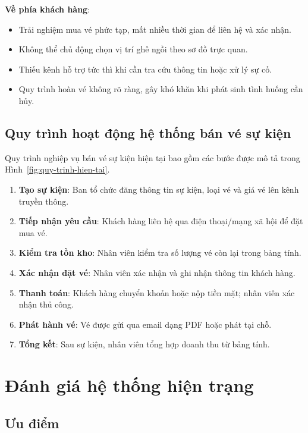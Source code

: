 \documentclass[../main.tex]{subfiles}
\begin{document}
\textbf{Về phía khách hàng}:
\begin{itemize}
    \item Trải nghiệm mua vé phức tạp, mất nhiều thời gian để liên hệ và xác nhận.
    \item Không thể chủ động chọn vị trí ghế ngồi theo sơ đồ trực quan.
    \item Thiếu kênh hỗ trợ tức thì khi cần tra cứu thông tin hoặc xử lý sự cố.
    \item Quy trình hoàn vé không rõ ràng, gây khó khăn khi phát sinh tình huống cần hủy.
\end{itemize}

\subsection{Quy trình hoạt động hệ thống bán vé sự kiện}

Quy trình nghiệp vụ bán vé sự kiện hiện tại bao gồm các bước được mô tả trong Hình~\ref{fig:quy-trinh-hien-tai}.

\begin{enumerate}
    \item \textbf{Tạo sự kiện}: Ban tổ chức đăng thông tin sự kiện, loại vé và giá vé lên kênh truyền thông.
    \item \textbf{Tiếp nhận yêu cầu}: Khách hàng liên hệ qua điện thoại/mạng xã hội để đặt mua vé.
    \item \textbf{Kiểm tra tồn kho}: Nhân viên kiểm tra số lượng vé còn lại trong bảng tính.
    \item \textbf{Xác nhận đặt vé}: Nhân viên xác nhận và ghi nhận thông tin khách hàng.
    \item \textbf{Thanh toán}: Khách hàng chuyển khoản hoặc nộp tiền mặt; nhân viên xác nhận thủ công.
    \item \textbf{Phát hành vé}: Vé được gửi qua email dạng PDF hoặc phát tại chỗ.
    \item \textbf{Tổng kết}: Sau sự kiện, nhân viên tổng hợp doanh thu từ bảng tính.
\end{enumerate}

\section{Đánh giá hệ thống hiện trạng}

\subsection{Ưu điểm}
\end{document}
